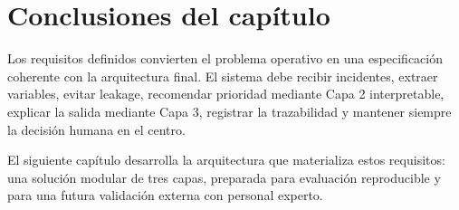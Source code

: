 \section{Conclusiones del capítulo}

Los requisitos definidos convierten el problema operativo en una especificación coherente con la arquitectura final. El sistema debe recibir incidentes, extraer variables, evitar leakage, recomendar prioridad mediante Capa 2 interpretable, explicar la salida mediante Capa 3, registrar la trazabilidad y mantener siempre la decisión humana en el centro.

El siguiente capítulo desarrolla la arquitectura que materializa estos requisitos: una solución modular de tres capas, preparada para evaluación reproducible y para una futura validación externa con personal experto.
